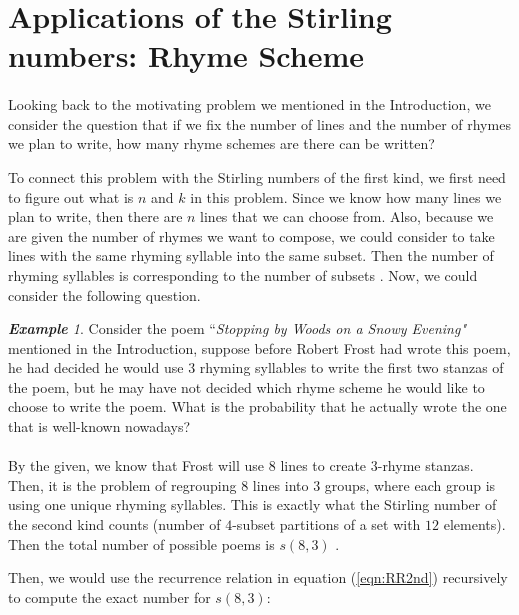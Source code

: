 \documentclass{article}
\theoremstyle{definition}
\theoremstyle{remark}
\theoremstyle{example}
\newtheorem{example}{\textbf{Example}}[section]
\begin{document}
\section{Applications of the Stirling numbers: Rhyme Scheme}
\paragraph{  }

Looking back to the motivating problem we mentioned in the Introduction, we consider the question that if we fix the number of lines and the number of rhymes we plan to write, how many rhyme schemes are there can be written?

To connect this problem with the Stirling numbers of the first kind, we first need to figure out what is $n$ and $k$ in this problem. Since we know how many lines we plan to write, then there are $n$ lines that we can choose from. Also, because we are given the number of rhymes we want to compose, we could consider to take lines with the same rhyming syllable into the same subset. Then the number of rhyming syllables is corresponding to the number of subsets \cite{rogers_rhyming_1981}. Now, we could consider the following question.

\begin{example}

Consider the poem ``\textit{Stopping by Woods on a Snowy Evening"} mentioned in the Introduction, suppose before Robert Frost had wrote this poem, he had decided he would use $3$ rhyming syllables to write the first two stanzas of the poem, but he may have not decided which rhyme scheme he would like to choose to write the poem. What is the probability that he actually wrote the one that is well-known nowadays?
\end{example}

\paragraph{  }

By the given, we know that Frost will use $8$ lines to create $3$-rhyme stanzas. Then, it is the problem of regrouping $8$ lines into $3$ groups, where each group is using one unique rhyming syllables. This is exactly what the Stirling number of the second kind counts (number of $4$-subset partitions of a set with $12$ elements). Then the total number of possible poems is $s(8,3)$ \cite{pollard_c_2003}.

Then, we would use the recurrence relation in equation (\ref{eqn:RR2nd}) recursively to compute the exact number for $s(8,3)$:
\end{document}
